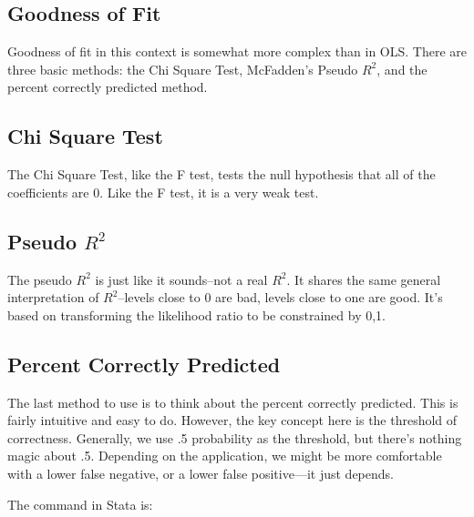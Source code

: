 \documentclass[12pt]{article}
\begin{document}
\subsection{Goodness of Fit}

Goodness of fit in this context is somewhat more complex than in
OLS. There are three basic methods: the Chi Square Test, McFadden's
Pseudo $R^2$, and the percent correctly predicted method.

\subsection{Chi Square Test}

The Chi Square Test, like the F test, tests the null hypothesis that
all of the coefficients are 0. Like the F test, it is  a very weak
test. 

\subsection{Pseudo $R^2$}

The pseudo $R^2$ is just like it sounds--not a real $R^2$. It shares
the same general interpretation of $R^2$--levels close to 0 are bad,
levels close to one are good. It's based on transforming the
likelihood ratio to be constrained by 0,1. 

\subsection{Percent Correctly Predicted}

The last method to use is to think about the percent correctly
predicted. This is fairly intuitive and easy to do. However, the key
concept here is the threshold of correctness. Generally, we use .5
probability as the threshold, but there's nothing magic about
.5. Depending on the application, we might be more comfortable with a
lower false negative, or a lower false positive---it just depends. 

The command in Stata is:
\end{document}
